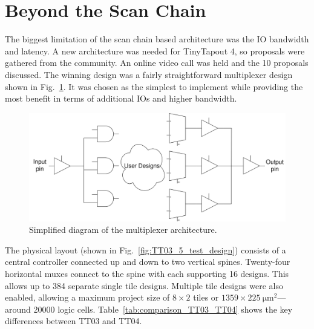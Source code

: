\section{Beyond the Scan Chain}
\label{sec:beyond_scanchain}
The biggest limitation of the scan chain based architecture was the IO bandwidth and latency.
A new architecture was needed for TinyTapout 4, so proposals were gathered from the community.
An online video call was held and the 10 proposals discussed.
The winning design was a fairly straightforward multiplexer design shown in Fig.~\ref{fig:multiplexer_design}. It was chosen as the simplest to implement while providing the most benefit in terms of additional IOs and higher bandwidth.

\begin{figure}[!t]
\centering
\includegraphics[width=\columnwidth]{./Figs/mux architecture.png}
\caption{Simplified diagram of the multiplexer architecture.}
\label{fig:multiplexer_design}
\end{figure}

The physical layout (shown in Fig.~\ref{fig:TT03_5_test_design}) consists of a central controller connected up and down to two vertical spines.
Twenty-four horizontal muxes connect to the spine with each supporting 16 designs.
This allows up to 384 separate single tile designs.
Multiple tile designs were also enabled, allowing a maximum project size of $8 \times 2$ tiles or $1359 \times \qty{225}{\um\squared}$---around \num{20000} logic cells. Table~\ref{tab:comparison_TT03_TT04} shows the key differences between TT03 and TT04.

